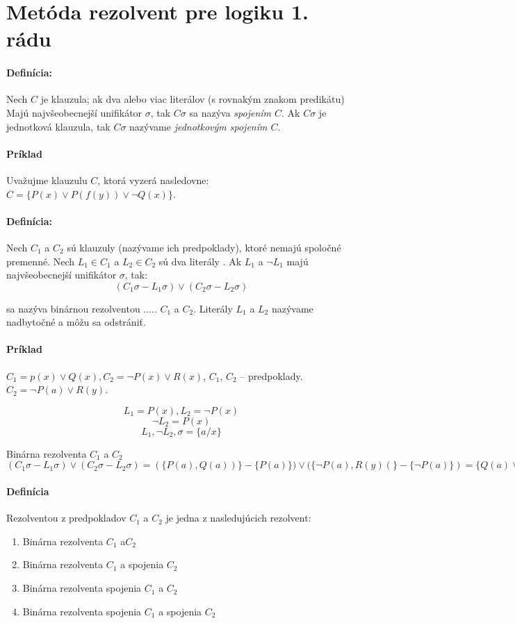 \section {Metóda rezolvent pre logiku 1. rádu}
\startFIXME

\paragraph{Definícia:} Nech $C$ je klauzula; ak dva alebo viac literálov (s
rovnakým znakom predikátu) Majú najvšeobecnejší unifikátor $\sigma$, tak
$C\sigma$ sa nazýva \emph{spojením $C$}. Ak $C\sigma$ je jednotková klauzula,
tak $C\sigma$ nazývame \emph{jednotkovým spojením $C$}.


\paragraph{Príklad} Uvažujme klauzulu $C$, ktorá vyzerá nasledovne: $C = \{ P(x)
\lor P(f(y)) \lor \neg Q(x)\}$. 

\paragraph{Definícia:} Nech $C_1$ a $C_2$ sú klauzuly (nazývame ich
predpoklady), ktoré nemajú spoločné premenné. Nech $L_1 \in C_1$ a $L_2 \in
C_2$ sú dva literály . Ak $L_1$ a $\neg L_1$ majú najvšeobecnejší unifikátor
$\sigma$, tak:
$$(C_1\sigma - L_1\sigma) \lor (C_2\sigma - L_2\sigma)$$

sa nazýva binárnou rezolventou ..... $C_1$ a $C_2$. Literály $L_1$ a $L_2$ nazývame
nadbytočné a môžu sa odstrániť.

\paragraph{Príklad} $C_1 = p(x) \lor Q(x), C_2 = \neg P(x) \lor R(x)$, $C_1$,
$C_2$ -- predpoklady. $C_2 = \neg P(a) \lor R(y)$.

$$L_1 = P(x), L_2 = \neg P(x)$$
$$\neg L_2 = P(x)$$
$$L_1, \neg L_2, \sigma = \{a/x\}$$

Binárna rezolventa $C_1$ a $C_2$ $(C_1\sigma - L_1\sigma) \lor (C_2\sigma -
L_2\sigma) = (\{P(a),Q(a))\} - \{P(a)\}) \lor (\{\neg P(a),R(y)(\}-\{\neg
P(a)\}) = \{Q(a)\lor R(y)\}$

\paragraph{Definícia} Rezolventou z predpokladov $C_1$ a $C_2$ je jedna z
nasledujúcich rezolvent:
\begin{enumerate}
	\item Binárna rezolventa $C_1$ a$C_2$
	\item Binárna rezolventa $C_1$ a spojenia $C_2$
	\item Binárna rezolventa spojenia $C_1$ a $C_2$
	\item Binárna rezolventa spojenia $C_1$ a spojenia $C_2$
\end{enumerate}

